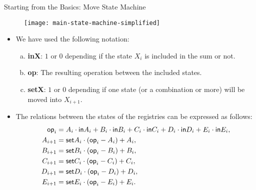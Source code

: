 
\begin{frame}[allowframebreaks]{Starting from the Basics: Move State Machine}
\vspace{-0.3cm}
\begin{figure}
	\texttt{[image: main-state-machine-simplified]}
\end{figure}

\begin{itemize}
\item We have used the following notation:
\begin{enumerate}[a)]
\item \textbf{inX}: $1$ or $0$ depending if the state $X_i$ is included in the sum or not.

\item \textbf{op}: The resulting operation between the included states.

\item \textbf{setX}: $1$ or $0$ depending if one state (or a combination or more) will be moved into $X_{i+1}$.
\end{enumerate}
 
\item The relations between the states of the registries can be expressed as follows:
\begin{align*}
\mathsf{op}_i &= A_i \cdot \mathsf{in} A_i + B_i \cdot \mathsf{in} B_i + C_i \cdot \mathsf{in} C_i + D_i \cdot \mathsf{in} D_i + E_i \cdot \mathsf{in} E_i, \\
A_{i+1} &= \mathsf{set} A_i \cdot (\mathsf{op}_i - A_i) + A_i, \\
B_{i+1} &= \mathsf{set} B_i \cdot (\mathsf{op}_i - B_i) + B_i, \\
C_{i+1} &= \mathsf{set} C_i \cdot (\mathsf{op}_i - C_i) + C_i, \\
D_{i+1} &= \mathsf{set} D_i \cdot (\mathsf{op}_i - D_i) + D_i, \\
E_{i+1} &= \mathsf{set} E_i \cdot (\mathsf{op}_i - E_i) + E_i.
\end{align*}
\end{itemize}
\end{frame}










